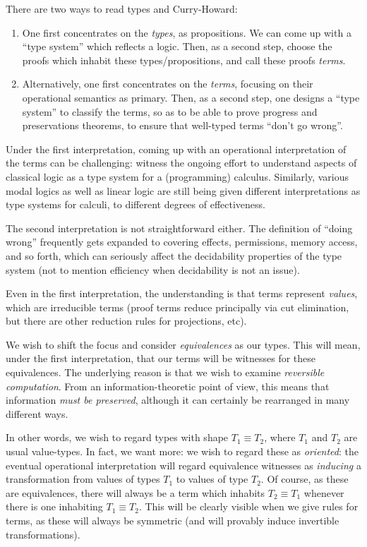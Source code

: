 There are two ways to read types and Curry-Howard: 
\begin{enumerate}
\item One first concentrates on the \emph{types}, as propositions.  We can come up with a ``type system'' which 
reflects a logic.  Then, as a second step, choose the proofs which inhabit these types/propositions, and call these
proofs \emph{terms}.
\item Alternatively, one first concentrates on the \emph{terms}, focusing on their operational semantics as primary.
Then, as a second step, one designs a ``type system'' to classify the terms, so as to be able to prove progress and
preservations theorems, to ensure that well-typed terms ``don't go wrong''.
\end{enumerate}

Under the first interpretation, coming up with an operational interpretation of the terms can be challenging:
witness the ongoing effort to understand aspects of classical logic as a type system for a (programming) calculus.
Similarly, various modal logics as well as linear logic are still being given different interpretations as type
systems for calculi, to different degrees of effectiveness.

The second interpretation is not straightforward either.  The definition of ``doing wrong'' frequently gets 
expanded to covering effects, permissions, memory access, and so forth, which can seriously affect the decidability
properties of the type system (not to mention efficiency when decidability is not an issue).

Even in the first interpretation, the understanding is that terms represent \emph{values}, which are irreducible
terms (proof terms reduce principally via cut elimination, but there are other reduction rules for projections, etc).

We wish to shift the focus and consider \emph{equivalences} as our types.  This will mean, under the first 
interpretation, that our terms will be witnesses for these equivalences.  The underlying reason is that we wish
to examine \emph{reversible computation}.  From an information-theoretic point of view, this means that information
\emph{must be preserved}, although it can certainly be rearranged in many different ways.

In other words, we wish to regard types with shape $T_1\equiv T_2$, where $T_1$ and $T_2$ are usual value-types.
In fact, we want more: we wish to regard these as \emph{oriented}: the eventual operational interpretation
will regard equivalence witnesses as \emph{inducing} a transformation from values of types $T_1$ to values of type $T_2$.
Of course, as these are equivalences, there will always be a term which inhabits $T_2\equiv T_1$ whenever there
is one inhabiting $T_1 \equiv T_2$.  This will be clearly visible when we give rules for terms, as these will always
be symmetric (and will provably induce invertible transformations).


